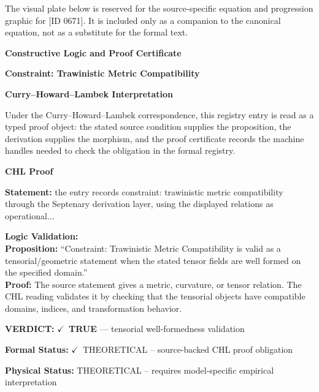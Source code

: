 \begingroup\footnotesize\sloppy
The visual plate below is reserved for the source-specific equation and progression graphic for [ID 0671]. It is included only as a companion to the canonical equation, not as a substitute for the formal text.
\par\endgroup
\ifTZPDarkEdition
{}
\fi

\clearpage
\begingroup\tzpsupportsetup
\noindent\textbf{\fontsize{10.8pt}{12.8pt}\selectfont [ID 0671] Constructive Logic and Proof Certificate}\par
\noindent\textbf{\fontsize{10pt}{12pt}\selectfont Constraint: Trawinistic Metric Compatibility}\par
\vspace{0.45em}
\begingroup
\footnotesize
\setlength{\parskip}{0.22em}
\setlength{\parindent}{0pt}
\noindent\textbf{Curry--Howard--Lambek Interpretation}\par
Under the Curry--Howard--Lambek correspondence, this registry entry is read as a typed proof
object: the stated source condition supplies the proposition, the derivation supplies the
morphism, and the proof certificate records the machine handles needed to check the obligation
in the formal registry.

\vspace{0.45em}
\noindent\textbf{CHL Proof}\par
\textbf{Statement:} the entry records constraint: trawinistic metric compatibility through the Septenary
derivation layer, using the displayed relations as operational...

\textbf{Logic Validation:}\\
\textbf{Proposition:} ``Constraint: Trawinistic Metric Compatibility is valid as a tensorial/geometric statement
when the stated tensor fields are well formed on the specified domain.''\\
\textbf{Proof:} The source statement gives a metric, curvature, or tensor relation. The CHL reading
validates it by checking that the tensorial objects have compatible domains, indices,
and transformation behavior.

\textbf{VERDICT:} \ensuremath{\checkmark}\ \textbf{TRUE} --- tensorial well-formedness validation

\textbf{Formal Status:} \ensuremath{\checkmark}\ THEORETICAL -- source-backed CHL proof obligation

\textbf{Physical Status:} THEORETICAL -- requires model-specific empirical interpretation
\par\vspace{0.45em}
\par
\ifTZPDarkEdition
{}
\fi
\endgroup
\endgroup
